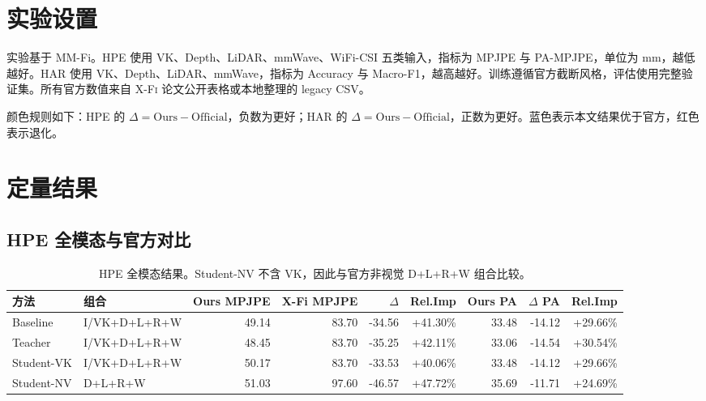 \documentclass[UTF8,10pt,a4paper]{ctexart}
\newcommand{\better}[1]{\textcolor{ImpBlue}{#1}}
\newcommand{\xfi}{\textsc{X-Fi}}
\newcommand{\dataset}{MM-Fi}
\begin{document}
\section{实验设置}
实验基于 \dataset{}。HPE 使用 VK、Depth、LiDAR、mmWave、WiFi-CSI 五类输入，指标为 MPJPE 与 PA-MPJPE，单位为 mm，越低越好。HAR 使用 VK、Depth、LiDAR、mmWave，指标为 Accuracy 与 Macro-F1，越高越好。训练遵循官方截断风格，评估使用完整验证集。所有官方数值来自 \xfi{} 论文公开表格或本地整理的 legacy CSV。

颜色规则如下：HPE 的 $\Delta=\mathrm{Ours}-\mathrm{Official}$，负数为更好；HAR 的 $\Delta=\mathrm{Ours}-\mathrm{Official}$，正数为更好。蓝色表示本文结果优于官方，红色表示退化。

\section{定量结果}
\subsection{HPE 全模态与官方对比}
\begin{table}[H]\centering\small
\caption{HPE 全模态结果。Student-NV 不含 VK，因此与官方非视觉 D+L+R+W 组合比较。}
\begin{tabular}{llrrrrrrr}
\toprule
方法 & 组合 & Ours MPJPE & X-Fi MPJPE & $\Delta$ & Rel.Imp & Ours PA & $\Delta$ PA & Rel.Imp\\
\midrule
Baseline & I/VK+D+L+R+W & 49.14 & 83.70 & \better{-34.56} & \better{+41.30\%} & 33.48 & \better{-14.12} & \better{+29.66\%}\\
Teacher & I/VK+D+L+R+W & 48.45 & 83.70 & \better{-35.25} & \better{+42.11\%} & 33.06 & \better{-14.54} & \better{+30.54\%}\\
Student-VK & I/VK+D+L+R+W & 50.17 & 83.70 & \better{-33.53} & \better{+40.06\%} & 33.48 & \better{-14.12} & \better{+29.66\%}\\
Student-NV & D+L+R+W & 51.03 & 97.60 & \better{-46.57} & \better{+47.72\%} & 35.69 & \better{-11.71} & \better{+24.69\%}\\
\bottomrule
\end{tabular}
\end{table}
\end{document}
